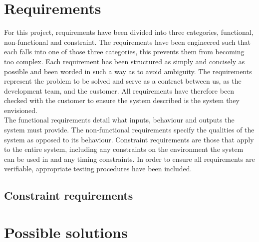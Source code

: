 \documentclass[10pt,a4paper]{article}
\begin{document}
\section{Requirements}
For this project, requirements have been divided into three categories, functional, non-functional and constraint. The requirements have been engineered such that each falls into one of those three categories, this prevents them from becoming too complex. Each requirement has been structured as simply and concisely as possible and been worded in such a way as to avoid ambiguity. The requirements represent the problem to be solved and serve as a contract between us, as the development team, and the customer. All requirements have therefore been checked with the customer to ensure the system described is the system they envisioned.\\
The functional requirements detail what inputs, behaviour and outputs the system must provide. The non-functional requirements specify the qualities of the system as opposed to its behaviour. Constraint requirements are those that apply to the entire system, including any constraints on the environment the system can be used in and any timing constraints. In order to ensure all requirements are verifiable, appropriate testing procedures have been included.







\subsection{Constraint requirements}

\section{Possible solutions}
\end{document}

